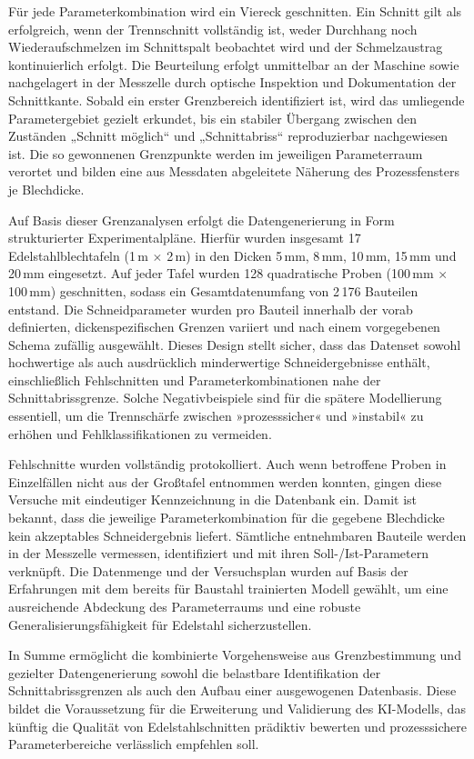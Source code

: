 Für jede Parameterkombination wird ein Viereck geschnitten. Ein Schnitt gilt als erfolgreich, wenn der Trennschnitt vollständig ist, weder Durchhang noch Wiederaufschmelzen im Schnittspalt beobachtet wird und der Schmelzaustrag kontinuierlich erfolgt. Die Beurteilung erfolgt unmittelbar an der Maschine sowie nachgelagert in der Messzelle durch optische Inspektion und Dokumentation der Schnittkante. Sobald ein erster Grenzbereich identifiziert ist, wird das umliegende Parametergebiet gezielt erkundet, bis ein stabiler Übergang zwischen den Zuständen „Schnitt möglich“ und „Schnittabriss“ reproduzierbar nachgewiesen ist. Die so gewonnenen Grenzpunkte werden im jeweiligen Parameterraum verortet und bilden eine aus Messdaten abgeleitete Näherung des Prozessfensters je Blechdicke.

Auf Basis dieser Grenzanalysen erfolgt die Datengenerierung in Form strukturierter Experimentalpläne. Hierfür wurden insgesamt 17 Edelstahlblechtafeln (1\,\ac{m} $\times$ 2\,\ac{m})  in den Dicken 5\,mm, 8\,mm, 10\,mm, 15\,mm und 20\,mm eingesetzt. Auf jeder Tafel wurden 128 quadratische Proben (100\,mm $\times$ 100\,mm) geschnitten, sodass ein Gesamtdatenumfang von 2\,176 Bauteilen entstand. Die Schneidparameter wurden pro Bauteil innerhalb der vorab definierten, dickenspezifischen Grenzen variiert und nach einem vorgegebenen Schema zufällig ausgewählt. Dieses Design stellt sicher, dass das Datenset sowohl hochwertige als auch ausdrücklich minderwertige Schneidergebnisse enthält, einschließlich Fehlschnitten und Parameterkombinationen nahe der Schnittabrissgrenze. Solche Negativbeispiele sind für die spätere Modellierung essentiell, um die Trennschärfe zwischen »prozesssicher« und »instabil« zu erhöhen und Fehlklassifikationen zu vermeiden.

Fehlschnitte wurden vollständig protokolliert. Auch wenn betroffene Proben in Einzelfällen nicht aus der Großtafel entnommen werden konnten, gingen diese Versuche mit eindeutiger Kennzeichnung in die Datenbank ein. Damit ist bekannt, dass die jeweilige Parameterkombination für die gegebene Blechdicke kein akzeptables Schneidergebnis liefert. Sämtliche entnehmbaren Bauteile werden in der Messzelle vermessen, identifiziert und mit ihren Soll-/Ist-Parametern verknüpft. Die Datenmenge und der Versuchsplan wurden auf Basis der Erfahrungen mit dem bereits für Baustahl trainierten Modell gewählt, um eine ausreichende Abdeckung des Parameterraums und eine robuste Generalisierungsfähigkeit für Edelstahl sicherzustellen.

In Summe ermöglicht die kombinierte Vorgehensweise aus Grenzbestimmung und gezielter Datengenerierung sowohl die belastbare Identifikation der Schnittabrissgrenzen als auch den Aufbau einer ausgewogenen Datenbasis. Diese bildet die Voraussetzung für die Erweiterung und Validierung des KI-Modells, das künftig die Qualität von Edelstahlschnitten prädiktiv bewerten und prozesssichere Parameterbereiche verlässlich empfehlen soll.


